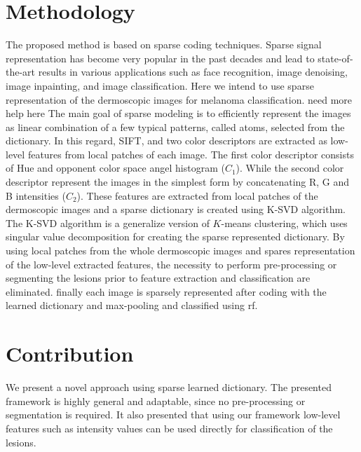 \section{Methodology}
\label{sec:method}
\graphicspath{ {./content/method/figures/} }
The proposed method is based on sparse coding techniques. 
Sparse signal representation has become very popular in the past decades and lead to state-of-the-art results in various applications such as face recognition, image denoising, image inpainting, and image classification. 
Here we intend to use sparse representation of the dermoscopic images for melanoma classification.
{\color{red}need more help here}
The main goal of sparse modeling is to efficiently represent the images as linear combination of a few typical patterns, called atoms, selected from the dictionary. 
In this regard, SIFT, and two color descriptors are extracted as low-level features from local patches of each image. 
The first color descriptor consists of Hue and opponent color space angel histogram ($C_{1}$). 
While the second color descriptor represent the images in the simplest form by concatenating R, G and B intensities ($C_{2}$). 
These features are extracted from local patches of the dermoscopic images and a sparse dictionary is created using  
K-SVD algorithm. 
The K-SVD algorithm is a generalize version of $K$-means clustering, which uses singular value decomposition for creating the sparse represented dictionary.
By using local patches from the whole dermoscopic images and spares representation of the low-level extracted features, the necessity to perform pre-processing or segmenting the lesions prior to feature extraction and classification are eliminated.
finally each image is sparsely represented after coding with the learned dictionary and max-pooling and classified using \ac{rf}. 


\section{Contribution}
We present a novel approach using sparse learned dictionary. The presented framework is highly general and adaptable, since no pre-processing or segmentation is required. It also presented that using our framework low-level features such as intensity values can be used directly for classification of the lesions. 




